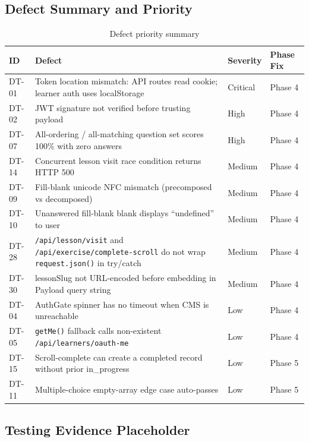 \subsection{Defect Summary and Priority}

\begin{table}[H]
\centering
\begin{tabularx}{\linewidth}{l X l l}
\toprule
ID & Defect & Severity & Phase Fix \\
\midrule
DT-01 & Token location mismatch: API routes read cookie; learner auth uses localStorage & Critical & Phase 4 \\
DT-02 & JWT signature not verified before trusting payload & High & Phase 4 \\
DT-07 & All-ordering / all-matching question set scores 100\% with zero answers & High & Phase 4 \\
DT-14 & Concurrent lesson visit race condition returns HTTP 500 & Medium & Phase 4 \\
DT-09 & Fill-blank unicode NFC mismatch (precomposed vs decomposed) & Medium & Phase 4 \\
DT-10 & Unanswered fill-blank blank displays ``undefined'' to user & Medium & Phase 4 \\
DT-28 & \texttt{/api/lesson/visit} and \texttt{/api/exercise/complete-scroll} do not wrap \texttt{request.json()} in try/catch & Medium & Phase 4 \\
DT-30 & lessonSlug not URL-encoded before embedding in Payload query string & Medium & Phase 4 \\
DT-04 & AuthGate spinner has no timeout when CMS is unreachable & Low & Phase 4 \\
DT-05 & \texttt{getMe()} fallback calls non-existent \texttt{/api/learners/oauth-me} & Low & Phase 4 \\
DT-15 & Scroll-complete can create a completed record without prior in\_progress & Low & Phase 5 \\
DT-11 & Multiple-choice empty-array edge case auto-passes & Low & Phase 5 \\
\bottomrule
\end{tabularx}
\caption{Defect priority summary}
\end{table}

\subsection{Testing Evidence Placeholder}

